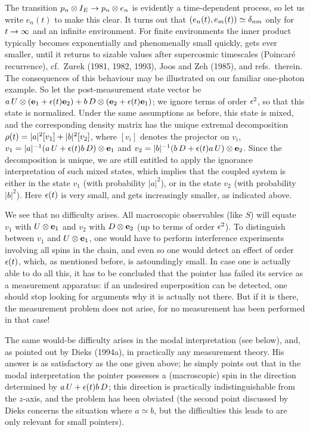 The transition $p_n\otimes I_E\rightarrow p_n\otimes e_n$ is evidently a time-dependent
process, so let us write
$e_n(t)$ to make this clear. It turns out that $(e_n(t),e_m(t))\simeq \delta_{nm}$
only for $t\rightarrow
\infty$ and an infinite environment. For finite environments the inner product
typically becomes
exponentially and phenomenally small quickly, gets ever smaller, until it
returns to sizable values
after supercosmic timescales (Poincar\'{e} recurrence), cf.\  Zurek (1981,
1982, 1993), Joos and Zeh
(1985), and refs.\ therein. The consequences of this behaviour may be
illustrated on our familiar
one-photon example. So let the post-measurement state vector be $a\, U\otimes ({\bf
e}_1+\epsilon(t){\bf e}_2)
+ b\, D\otimes ({\bf e}_2+\epsilon(t){\bf e}_1)$; we ignore terms of order $\epsilon^2$, so
that this state is
normalized. Under  the same assumptions as before, this state is mixed, and the
corresponding density
matrix has the unique extremal decomposition $\rho(t)=|a|^2 [v_1]
+|b|^2[v_2]$, where $[v_i]$ denotes the projector on $v_i$,
$v_1=|a|^{-1}( a\, U+\epsilon(t)b\, D)\otimes {\bf e}_1$ and  $v_2= |b|^{-1}( b\, D
+\epsilon(t)a\, U)\otimes {\bf
e}_2$.
  Since the decomposition is unique, we are still entitled to apply the
ignorance interpretation of
such mixed states, which implies that the coupled system is either in the state
$v_1$ (with
probability $|a|^2$), or in the state $v_2$ (with probability $|b|^2$). Here
$\epsilon(t)$ is
very small,
 and gets increasingly smaller, as indicated above.

We see that no difficulty arises. All macroscopic observables (like $S$) will
equate $v_1$ with
$U\otimes {\bf e}_1$ and $v_2$ with $D\otimes {\bf e}_2$ (up to terms of order
$\epsilon^2$). To distinguish
between $v_1$ and  $U\otimes {\bf e}_1$, one would have to perform interference
experiments involving
all spins in the chain, and even so one would detect an effect of order
$\epsilon(t)$, which, as
mentioned before, is astoundingly small. In case one is actually able to do all
this, it has to be
concluded that the pointer has failed its service as a measurement apparatus:
if an undesired
superposition can be detected, one should stop looking for arguments why it is
actually not there.
But if it is there, the measurement problem does not arise, for no measurement
has been performed in
that case!

The same would-be difficulty arises in the modal interpretation (see below),
and, as pointed out by
Dieks (1994a), in practically any measurement theory. His answer is as
satisfactory as the one given
above; he simply points out that in the modal interpretation the pointer
possesses a (macroscopic)
spin in the direction determined by $ a\, U+\epsilon(t)b\, D$; this direction is
practically
indistinguishable from the $z$-axis, and the problem has been obviated (the
second point discussed by
Dieks concerns the situation where $a\simeq b$, but the difficulties this leads
to are only relevant
for small pointers).

